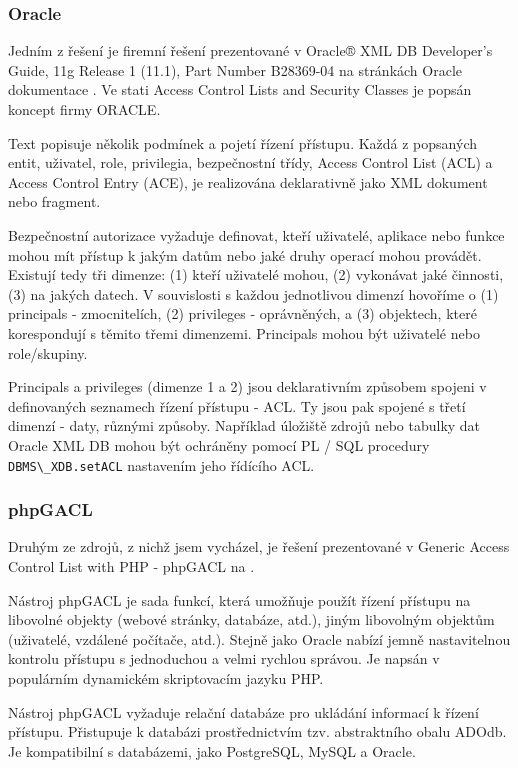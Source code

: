 \subsubsection{Oracle}
Jedním z řešení je firemní řešení prezentované v Oracle® XML DB Developer's Guide, 11g Release 1 (11.1), Part Number B28369-04 na stránkách Oracle dokumentace \cite{oracle}. Ve stati Access Control Lists and Security Classes je popsán koncept firmy ORACLE.
 
Text popisuje několik podmínek a pojetí řízení přístupu. Každá z popsaných entit, uživatel, role, privilegia, bezpečnostní třídy, Access Control List (ACL) a Access Control Entry (ACE), je realizována deklarativně jako XML dokument nebo fragment.  

Bezpečnostní autorizace vyžaduje definovat, kteří uživatelé, aplikace nebo funkce mohou mít přístup k jakým datům nebo jaké druhy operací mohou provádět. Existují tedy tři dimenze: (1) kteří uživatelé mohou, (2) vykonávat jaké činnosti, (3) na jakých datech. V souvislosti s každou jednotlivou dimenzí hovoříme o (1) principals - zmocnitelích, (2) privileges - oprávněných, a (3) objektech, které korespondují s těmito třemi dimenzemi. Principals mohou být uživatelé nebo role/skupiny.

Principals a privileges (dimenze 1 a 2) jsou deklarativním způsobem spojeni v definovaných seznamech řízení přístupu - ACL. Ty jsou pak spojené s třetí dimenzí - daty, různými způsoby. Například úložiště zdrojů nebo tabulky dat Oracle XML DB mohou být ochráněny pomocí PL / SQL procedury \verb|DBMS\_XDB.setACL| nastavením jeho řídícího ACL.


\subsubsection{phpGACL}
Druhým ze zdrojů, z nichž jsem vycházel, je řešení prezentované v Generic Access Control List with PHP - phpGACL na \cite{phpGACL}.

Nástroj phpGACL je sada funkcí, která umožňuje použít řízení přístupu na libovolné objekty (webové stránky, databáze, atd.), jiným libovolným objektům (uživatelé, vzdálené počítače, atd.). 
Stejně jako Oracle nabízí jemně nastavitelnou kontrolu přístupu s jednoduchou a velmi rychlou správou. Je napsán v populárním dynamickém skriptovacím jazyku PHP.

Nástroj phpGACL vyžaduje relační databáze pro ukládání informací k řízení přístupu. Přistupuje k databázi prostřednictvím tzv. abstraktního obalu ADOdb. Je kompatibilní s databázemi, jako PostgreSQL, MySQL a Oracle. 

